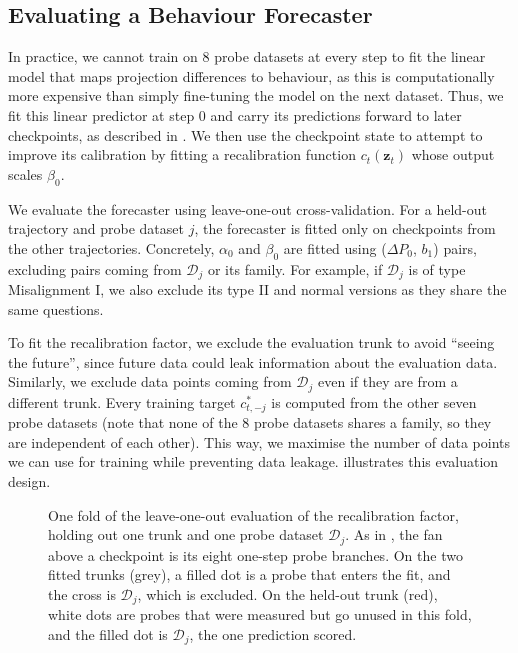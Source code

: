 \subsection{Evaluating a Behaviour Forecaster}
\label{subsec:forecaster_eval}
In practice, we cannot train on 8 probe datasets at every step to fit the linear model that maps projection differences to behaviour, as this is computationally more expensive than simply fine-tuning the model on the next dataset. Thus, we fit this linear predictor at step 0 and carry its predictions forward to later checkpoints, as described in . We then use the checkpoint state to attempt to improve its calibration by fitting a recalibration function $c_t(\mathbf{z}_t)$ whose output scales $\beta_0$.

We evaluate the forecaster using leave-one-out cross-validation. For a held-out trajectory and probe dataset $j$, the forecaster is fitted only on checkpoints from the other trajectories. Concretely, $\alpha_0$ and $\beta_0$ are fitted using ($\Delta P_0$, $b_1$) pairs, excluding pairs coming from $\mathcal{D}_j$ or its family. For example, if $\mathcal{D}_j$ is of type Misalignment I, we also exclude its type II and normal versions as they share the same questions.

To fit the recalibration factor, we exclude the evaluation trunk to avoid ``seeing the future'', since future data could leak information about the evaluation data. Similarly, we exclude data points coming from $\mathcal{D}_j$ even if they are from a different trunk. Every training target $c^{*}_{t,-j}$ is computed from the other seven probe datasets (note that none of the 8 probe datasets shares a family, so they are independent of each other). This way, we maximise the number of data points we can use for training while preventing data leakage.  illustrates this evaluation design. 

\begin{figure}[H]
    \centering
    
    \caption{One fold of the leave-one-out evaluation of the recalibration
    factor, holding out one trunk and one probe dataset $\mathcal{D}_j$. As in
    , the fan above a checkpoint is its eight one-step
    probe branches. On the two fitted trunks (grey), a filled dot is a probe
    that enters the fit, and the cross is $\mathcal{D}_j$, which is excluded. On the held-out trunk (red), white dots are probes that were measured but go unused in
    this fold, and the filled dot is $\mathcal{D}_j$, the one prediction
    scored.}
    \label{fig:exp2-loo}
\end{figure}

